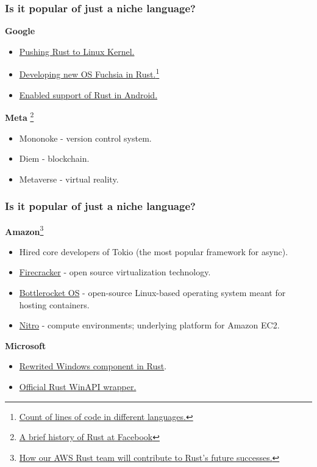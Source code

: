 \documentclass[aspectratio=1610,t]{beamer}
\begin{document}

\begin{frame}
\frametitle{Is it popular of just a niche language?}
\textbf{Google}

\begin{itemize}
    \item \href{https://security.googleblog.com/2021/04/rust-in-linux-kernel.html}{Pushing Rust to Linux Kernel.}
    \item \href{https://fuchsia.dev/fuchsia-src/development/languages/rust}{Developing new OS Fuchsia in Rust.}\footnote{\href{https://imgur.com/gknVmYk}{Count of lines of code in different languages.}}
    \item \href{https://security.googleblog.com/2021/04/rust-in-android-platform.html}{Enabled support of Rust in Android.}
\end{itemize}

\textbf{Meta} \footnote{\href{https://engineering.fb.com/2021/04/29/developer-tools/rust/}{A brief history of Rust at Facebook}}

\begin{itemize}
    \item Mononoke - version control system.
    \item Diem - blockchain.
    \item Metaverse - virtual reality.
\end{itemize}
\end{frame}


\begin{frame}
\frametitle{Is it popular of just a niche language?}
\textbf{Amazon}\footnote{\href{https://aws.amazon.com/blogs/opensource/how-our-aws-rust-team-will-contribute-to-rusts-future-successes/}{How our AWS Rust team will contribute to Rust’s future successes.}}

\begin{itemize}
    \item Hired core developers of Tokio (the most popular framework for async).
    \item \href{https://github.com/firecracker-microvm/firecracker}{Firecracker} - open source virtualization technology.
    \item \href{https://github.com/bottlerocket-os/bottlerocket}{Bottlerocket OS} - open-source Linux-based operating system meant for hosting containers.
    \item \href{https://aws.amazon.com/ec2/nitro/}{Nitro} - compute environments; underlying platform for Amazon EC2.
\end{itemize}

\textbf{Microsoft}

\begin{itemize}
    \item \href{https://msrc-blog.microsoft.com/2019/11/07/using-rust-in-windows/}{Rewrited Windows component in Rust}.
    \item \href{https://github.com/microsoft/windows-rs}{Official Rust WinAPI wrapper.}
\end{itemize}
\end{frame}
\end{document}
